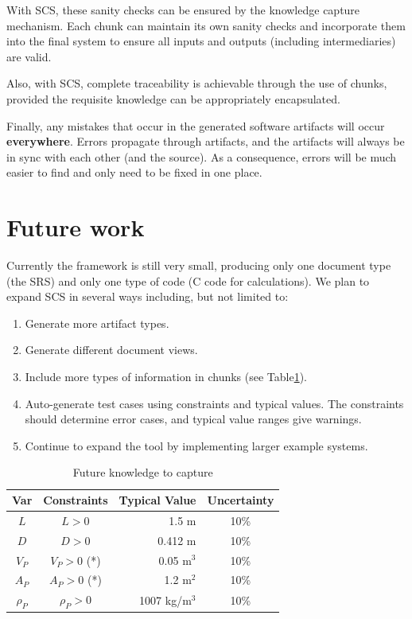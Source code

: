 \documentclass{sig-alternate-05-2015}
\newcommand{\lss}{SCS}
\begin{document}
With \lss, these sanity checks can be ensured by the knowledge capture
mechanism. Each chunk can maintain its own sanity checks and incorporate them
into the final system to ensure all inputs and outputs (including
intermediaries) are valid.

Also, with \lss{}, complete traceability is achievable through the use of
chunks, provided the requisite knowledge can be appropriately encapsulated.

Finally, any mistakes that occur in the generated software artifacts will occur
\textbf{everywhere}. Errors propagate through artifacts, and the artifacts will
always be in sync with each other (and the source). As a consequence, errors
will be much easier to find and only need to be fixed in one place.

\section{Future work} \label{sec:todo}

Currently the framework is still very small, producing only one document type
(the SRS) and only one type of code (C code for calculations). We plan to expand
\lss{} in several ways including, but not limited to:

\begin{enumerate}
\item Generate more artifact types. %
\item Generate different document views. %
\item Include more types of information in chunks (see Table\ref{tab:pcm}).
\item Auto-generate test cases using constraints and typical values. The
  constraints should determine error cases, and typical value ranges give
  warnings.
\item Continue to expand the tool by implementing larger example systems.
\end{enumerate}

\begin{table} \label{tab:pcm}
\centering
\caption{Future knowledge to capture}
\begin{tabular}{|c|c|r|c|} \hline
\textbf{Var} & \textbf{Constraints} & \textbf{Typical Value} & \textbf{Uncertainty}\\ \hline
$L$ & $L > 0$ & 1.5 m & 10\% \\ \hline
$D$ & $D > 0$ & 0.412 m & 10\% \\ \hline
$V_P$ & $V_P > 0$ (*)	& 0.05 m$^3$	& 10\% \\ \hline
$A_P$ & $A_P > 0$ (*)	& 1.2 m$^2$	& 10\% \\ \hline
$\rho_P$ & $\rho_P > 0$	& 1007 kg/m$^3$	& 10\% \\
\hline\end{tabular}
\end{table}
\end{document}
